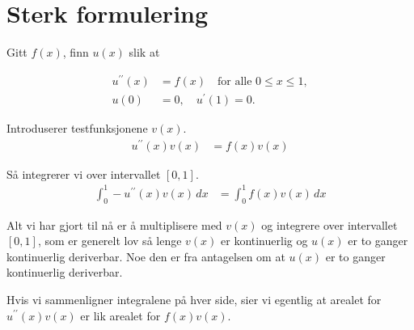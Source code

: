\section{Sterk formulering}
Gitt $f(x)$, finn $u(x)$ slik at

\begin{align*}
  u^{\prime\prime}(x) & = f(x) \quad \text{for alle } 0 \leq x \leq 1, \\
  u(0)                & = 0,\quad u^{\prime}(1) = 0.
\end{align*}

Introduserer testfunksjonene $v(x)$.
\begin{align*}
  u^{\prime\prime}(x) v(x) & = f(x) v(x)
\end{align*}

Så integrerer vi over intervallet $[0,1]$.
\begin{align*}
  \int_0^1 -u^{\prime\prime}(x) v(x) \, dx & = \int_0^1 f(x) v(x) \, dx
\end{align*}

Alt vi har gjort til nå er å multiplisere med $v(x)$ og integrere over intervallet $[0,1]$, som er generelt lov så lenge $v(x)$ er kontinuerlig og $u(x)$ er to ganger kontinuerlig deriverbar.
Noe den er fra antagelsen om at $u(x)$ er to ganger kontinuerlig deriverbar.

Hvis vi sammenligner integralene på hver side, sier vi egentlig at arealet for $u^{\prime\prime}(x) v(x)$ er lik arealet for $f(x) v(x)$.

